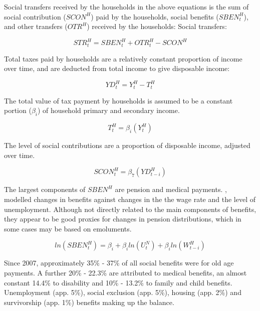 \documentclass[
]{book}
\begin{document}
Social transfers received by the households in the above equations is the sum of social contribution (\(SCON^H\)) paid by the households, social benefits (\(SBEN^H_t\)), and other transfers (\(OTR^H\)) received by the households:
Social transfers:

\begin{equation}
STR^H_t = SBEN^H_t + OTR^H_t - SCON^H
\end{equation}

Total taxes paid by households are a relatively constant proportion of income over time,
and are deducted from total income to give disposable income:

\begin{equation}
YD^H_t = Y^H_t - T^H_t
\end{equation}

The total value of tax payment by households is assumed to be a constant portion (\(\beta _i\))
of household primary and secondary income.

\begin{equation}
T^H_t = \beta _i (Y^H_t)
\end{equation}

The level of social contributions are a proportion of disposable income, adjusted over time.

\begin{equation}
SCON^H_t = \beta _7(YD^H_{t-i})
\end{equation}

The largest components of \(SBEN^H\) are pension and medical payments. \citet{byrialsenraza2019empirical},
modelled changes in benefits against changes in the the wage rate and
the level of unemployment. Although not directly related to the main components of
benefits, they appear to be good proxies for changes in pension distributions, which
in some cases may be based on emoluments.

\begin{equation}
ln(SBEN^H_t) = \beta _i + \beta _i ln(U^N_t) + \beta _i ln(W^H_{t-i})
\label{eq:socialbenefits}
\end{equation}

Since 2007, approximately 35\% - 37\% of all social benefits
were for old age payments. A further 20\% - 22.3\% are attributed to medical benefits, an almost
constant 14.4\% to disability and 10\% - 13.2\% to family and child benefits. Unemployment (app. 5\%),
social exclusion (app. 5\%), housing (app. 2\%) and survivorship (app. 1\%) benefits making up the balance.
\end{document}
